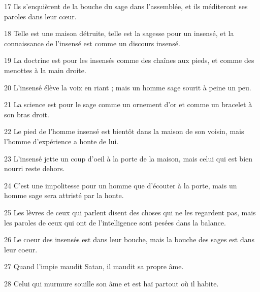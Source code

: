 \par 17 Ils s'enquièrent de la bouche du sage dans l'assemblée, et ils méditeront ses paroles dans leur cœur.
\par 18 Telle est une maison détruite, telle est la sagesse pour un insensé, et la connaissance de l'insensé est comme un discours insensé.
\par 19 La doctrine est pour les insensés comme des chaînes aux pieds, et comme des menottes à la main droite.
\par 20 L'insensé élève la voix en riant ; mais un homme sage sourit à peine un peu.
\par 21 La science est pour le sage comme un ornement d'or et comme un bracelet à son bras droit.
\par 22 Le pied de l'homme insensé est bientôt dans la maison de son voisin, mais l'homme d'expérience a honte de lui.
\par 23 L'insensé jette un coup d'oeil à la porte de la maison, mais celui qui est bien nourri reste dehors.
\par 24 C'est une impolitesse pour un homme que d'écouter à la porte, mais un homme sage sera attristé par la honte.
\par 25 Les lèvres de ceux qui parlent disent des choses qui ne les regardent pas, mais les paroles de ceux qui ont de l'intelligence sont pesées dans la balance.
\par 26 Le coeur des insensés est dans leur bouche, mais la bouche des sages est dans leur coeur.
\par 27 Quand l'impie maudit Satan, il maudit sa propre âme.
\par 28 Celui qui murmure souille son âme et est haï partout où il habite.


